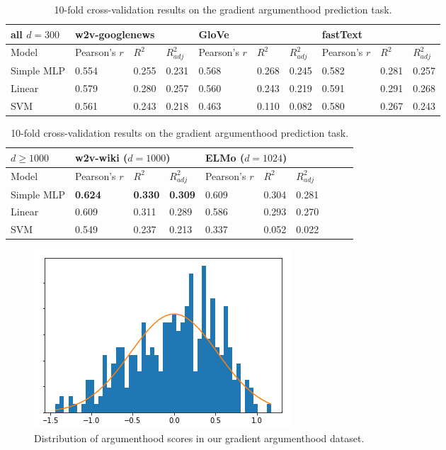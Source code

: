 \documentclass[letterpaper]{article} %
\begin{document}
\begin{table}[h]
\centering
\begin{tabular}{@{}llllllllll@{}}
\toprule
all $d=300$ & \multicolumn{3}{l}{w2v-googlenews} & \multicolumn{3}{l}{GloVe} & \multicolumn{3}{l}{fastText}\\ \midrule
Model       & Pearson's $r$ & $R^2$ & $R^2_{adj}$ & Pearson's $r$ & $R^2$ & $R^2_{adj}$ & Pearson's $r$ & $R^2$ & $R^2_{adj}$  \\ \midrule
Simple MLP & 0.554 & 0.255 &  0.231  \hspace{1cm} & 0.568 & 0.268 & 0.245 \hspace{1cm} & 0.582 & 0.281 & 0.257\\
Linear & 0.579 & 0.280 & 0.257 & 0.560 & 0.243 & 0.219 & 0.591 & 0.291 & 0.268 \\
SVM & 0.561 & 0.243 & 0.218 & 0.463 & 0.110 & 0.082 & 0.580 & 0.267 & 0.243 \\
\midrule
\end{tabular}
\begin{tabular}{@{}llllllllll@{}}
\midrule
$d \ge 1000$& \multicolumn{3}{l}{w2v-wiki\footnotemark \hspace{0.05cm} ($d=1000$)}  & \multicolumn{3}{l}{ELMo ($d=1024$)} \\ \midrule
Model       & Pearson's $r$ & $R^2$ & $R^2_{adj}$ & Pearson's $r$ & $R^2$  & $R^2_{adj}$ \\ \midrule
Simple MLP & \textbf{0.624}  & \textbf{0.330} &  \textbf{0.309} \hspace{1cm} & 0.609 & 0.304 & 0.281 \\
Linear & 0.609 & 0.311 & 0.289 & 0.586 & 0.293  & 0.270 \\
SVM & 0.549 & 0.237 & 0.213 & 0.337 & 0.052  & 0.022  \\
\bottomrule
\end{tabular}
\caption{10-fold cross-validation results on the gradient argumenthood prediction task.}
\label{ex2:results}
\end{table}

\begin{figure}[h]
\centering
\includegraphics[width=0.8\linewidth]{distribution}
\caption{Distribution of argumenthood scores in our gradient argumenthood dataset.}
\label{fig:dist}
\end{figure}
\end{document}
